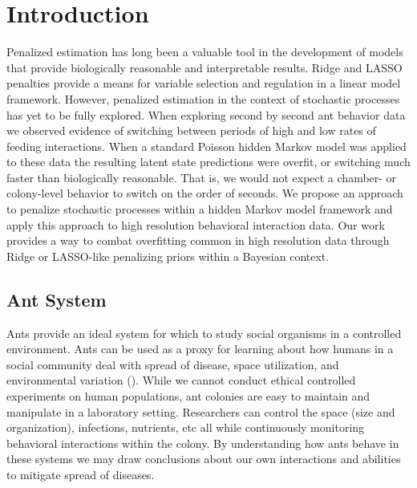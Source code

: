 \documentclass[ba]{imsart}
\begin{document}

\section{Introduction}
\label{s:intro}


Penalized estimation has long been a valuable tool in the development of models that provide biologically reasonable and interpretable results.  Ridge and LASSO penalties provide a means for variable selection and regulation in a linear model framework.  However, penalized estimation in the context of stochastic processes has yet to be fully explored. When exploring second by second ant behavior data we observed evidence of switching between periods of high and low rates of feeding interactions. When a standard Poisson hidden Markov model was applied to these data the resulting latent state predictions were overfit, or switching much faster than biologically reasonable. That is, we would not expect a chamber- or colony-level behavior to switch on the order of seconds. We propose an approach to penalize stochastic processes within a hidden Markov model framework and apply this approach to high resolution behavioral interaction data. Our work provides a way to combat overfitting common in high resolution data through  Ridge or LASSO-like penalizing priors within a Bayesian context.

\subsection{Ant System}
Ants provide an ideal system for which to study social organisms in a controlled environment. Ants can be used as a proxy for learning about how humans in a social community deal with spread of disease, space utilization, and environmental variation (\cite{Fewell2013}). While we cannot conduct ethical controlled experiments on human populations, ant colonies are easy to maintain and manipulate in a laboratory setting. Researchers can control the space (size and organization), infections, nutrients, etc all while continuously monitoring behavioral interactions within the colony. By understanding how ants behave in these systems we may draw conclusions about our own interactions and abilities to mitigate spread of diseases. 
\end{document}
